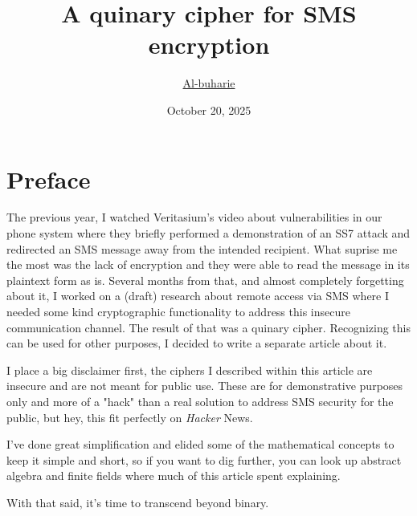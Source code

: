 \documentclass{article}
\title{A quinary cipher for SMS encryption}
\author{\href{https://github.com/harieamjari}{Al-buharie}}
\date{October 20, 2025}
\begin{document}
\maketitle

\section*{Preface}

The previous year, I watched Veritasium's video about vulnerabilities
in our phone system where they briefly performed a demonstration of
an   SS7 attack and redirected an SMS message away from the intended
recipient. What suprise me the most was the lack of encryption and
they were able to read the message in its plaintext form as is. Several
months from that, and almost completely forgetting about it, I worked
on a (draft) research about remote access via SMS where I needed some kind
cryptographic functionality to address this insecure communication
channel. The result of that was a quinary cipher. Recognizing this can
be used for other purposes,
I decided to write a separate article about it.

I place a big disclaimer first, the ciphers I described within this
article are insecure and are not meant for public use. These are for
demonstrative purposes only and more of a "hack" than a real solution
to address SMS security for the public, but hey, this fit perfectly on
\textit{Hacker} News.

I've done great simplification and elided some of the mathematical
concepts to keep it simple and short, so if you want to dig further,
you can look up abstract algebra and finite fields where much of this
article spent explaining.

\medskip

With that said, it's time to transcend beyond binary.

\newpage
\end{document}
